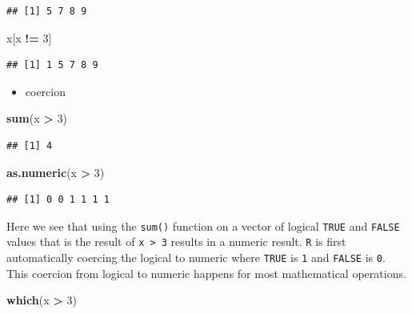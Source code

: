 \documentclass[]{book}
\newenvironment{Shaded}{\begin{snugshade}}{\end{snugshade}}
\newcommand{\KeywordTok}[1]{\textcolor[rgb]{0.13,0.29,0.53}{\textbf{#1}}}
\newcommand{\DecValTok}[1]{\textcolor[rgb]{0.00,0.00,0.81}{#1}}
\newcommand{\StringTok}[1]{\textcolor[rgb]{0.31,0.60,0.02}{#1}}
\newcommand{\OperatorTok}[1]{\textcolor[rgb]{0.81,0.36,0.00}{\textbf{#1}}}
\newcommand{\NormalTok}[1]{#1}
\providecommand{\tightlist}{%
  \setlength{\itemsep}{0pt}\setlength{\parskip}{0pt}}
\theoremstyle{definition}
\theoremstyle{definition}
\theoremstyle{definition}
\theoremstyle{remark}
\begin{document}
\begin{verbatim}
## [1] 5 7 8 9
\end{verbatim}

\begin{Shaded}
\begin{Highlighting}[]
\NormalTok{x[x }\OperatorTok{!=}\StringTok{ }\DecValTok{3}\NormalTok{]}
\end{Highlighting}
\end{Shaded}

\begin{verbatim}
## [1] 1 5 7 8 9
\end{verbatim}

\begin{itemize}
\tightlist
\item
  coercion
\end{itemize}

\begin{Shaded}
\begin{Highlighting}[]
\KeywordTok{sum}\NormalTok{(x }\OperatorTok{>}\StringTok{ }\DecValTok{3}\NormalTok{)}
\end{Highlighting}
\end{Shaded}

\begin{verbatim}
## [1] 4
\end{verbatim}

\begin{Shaded}
\begin{Highlighting}[]
\KeywordTok{as.numeric}\NormalTok{(x }\OperatorTok{>}\StringTok{ }\DecValTok{3}\NormalTok{)}
\end{Highlighting}
\end{Shaded}

\begin{verbatim}
## [1] 0 0 1 1 1 1
\end{verbatim}

Here we see that using the \texttt{sum()} function on a vector of
logical \texttt{TRUE} and \texttt{FALSE} values that is the result of
\texttt{x\ \textgreater{}\ 3} results in a numeric result. \texttt{R} is
first automatically coercing the logical to numeric where \texttt{TRUE}
is \texttt{1} and \texttt{FALSE} is \texttt{0}. This coercion from
logical to numeric happens for most mathematical operations.

\begin{Shaded}
\begin{Highlighting}[]
\KeywordTok{which}\NormalTok{(x }\OperatorTok{>}\StringTok{ }\DecValTok{3}\NormalTok{)}
\end{Highlighting}
\end{Shaded}
\end{document}
